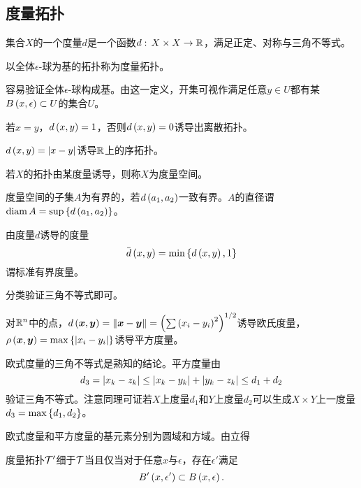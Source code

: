 \documentclass{ctexrep}
\begin{document}
  \subsection{度量拓扑}
  \begin{definition}
    集合$X$的一个度量$d$是一个函数$d:\, X\times X \rightarrow \mathbb{R}$，满足正定、对称与三角不等式。
  \end{definition}
  \begin{definition}
    以全体$\epsilon$-球为基的拓扑称为度量拓扑。
  \end{definition}
  容易验证全体$\epsilon$-球构成基。由这一定义，开集可视作满足任意$y\in U$都有某$B\left(x,\epsilon\right)\subset U$的集合$U$。
  \begin{ex}
    若$x=y$，$d\left(x,y\right)=1$，否则$d\left(x,y\right)=0$诱导出离散拓扑。
  \end{ex}
  \begin{ex}
    $d\left(x,y\right)=\abs{x-y}$诱导$\mathbb{R}$上的序拓扑。
  \end{ex}
  \begin{definition}
    若$X$的拓扑由某度量诱导，则称$X$为度量空间。
  \end{definition}
  \begin{definition}
    度量空间的子集$A$为有界的，若$d\left(a_1,a_2\right)$一致有界。$A$的直径谓$\mathrm{diam}\, A = \sup\left\{d\left(a_1,a_2\right)\right\}$。
  \end{definition}
  \begin{theorem}
    由度量$d$诱导的度量
    \[ \sbm{d}\pare{x,y} = \min\curb{d\pare{x,y}, 1} \]
    谓标准有界度量。
  \end{theorem}
  \begin{definition}
    分类验证三角不等式即可。
  \end{definition}
  \begin{definition}
    对$\mathbb{R}^n$中的点，$d\left(\boldsymbol{x},\boldsymbol{y}\right) = \norm{\boldsymbol{x}-\boldsymbol{y}} = \left(\sum\left(x_i-y_i\right)^2\right)^{1/2}$诱导欧氏度量，$\rho\left(\boldsymbol{x},\boldsymbol{y}\right) = \max\left\{\abs{x_i-y_i}\right\}$诱导平方度量。
  \end{definition}
  欧式度量的三角不等式是熟知的结论。平方度量由
  \[ d_3 = \abs{x_k-z_k} \le \abs{x_k-y_k} + \abs{y_k-z_k} \le d_1 + d_2 \]
  验证三角不等式。注意同理可证若$X$上度量$d_1$和$Y$上度量$d_2$可以生成$X\times Y$上一度量$d_3 = \max\left\{d_1,d_2\right\}$。
  \par
  欧式度量和平方度量的基元素分别为圆域和方域。由立得
  \begin{theorem}
    度量拓扑$\mathcal{T}'$细于$\mathcal{T}$当且仅当对于任意$x$与$\epsilon$，存在$\epsilon'$满足
    \[ B'\left(x,\epsilon'\right) \subset B\left(x, \epsilon\right). \]
  \end{theorem}
\end{document}
